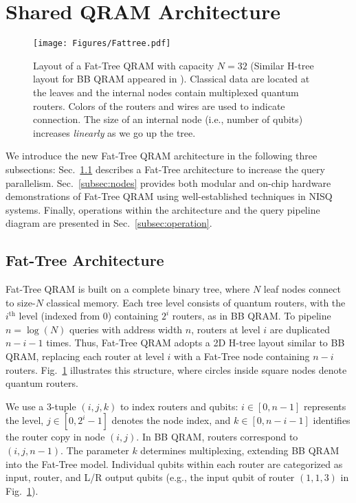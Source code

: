 \section{Shared QRAM Architecture}
\label{sec:arch}

\begin{figure}[t]
         \centering
         \texttt{[image: Figures/Fattree.pdf]}
         \caption{Layout of a Fat-Tree QRAM with capacity $N=32$ (Similar H-tree layout for BB QRAM appeared in \cite{xu2023systems}). Classical data are located at the leaves and the internal nodes contain multiplexed quantum routers. Colors of the routers and wires are used to indicate connection. The size of an internal node (i.e., number of qubits) increases \emph{linearly} as we go up the tree. 
         }
         \label{fig:fat}
\end{figure}

We introduce the new Fat-Tree QRAM architecture in the following three subsections: Sec.~\ref{subsec:fattree} describes a Fat-Tree architecture to increase the query parallelism. Sec.~\ref{subsec:nodes} provides both modular and on-chip hardware demonstrations of Fat-Tree QRAM using well-established techniques in NISQ systems. Finally, operations within the architecture and the query pipeline diagram are presented in Sec.~\ref{subsec:operation}.

\subsection{Fat-Tree Architecture}
\label{subsec:fattree}

Fat-Tree QRAM is built on a complete binary tree, where $N$ leaf nodes connect to size-$N$ classical memory. Each tree level consists of quantum routers, with the $i^{\text{th}}$ level (indexed from 0) containing $2^i$ routers, as in BB QRAM. To pipeline $n=\log(N)$ queries with address width $n$, routers at level $i$ are duplicated $n-i-1$ times. Thus, Fat-Tree QRAM adopts a 2D H-tree layout similar to BB QRAM, replacing each router at level $i$ with a Fat-Tree node containing $n-i$ routers. Fig.~\ref{fig:fat} illustrates this structure, where circles inside square nodes denote quantum routers. 

We use a 3-tuple $(i,j,k)$ to index routers and qubits: $i\in [0, n-1]$ represents the level, $j\in [0, 2^i-1]$ denotes the node index, and $k\in [0, n-i-1]$ identifies the router copy in node $(i,j)$. In BB QRAM, routers correspond to $(i,j,n-1)$. The parameter $k$ determines multiplexing, extending BB QRAM into the Fat-Tree model. Individual qubits within each router are categorized as input, router, and L/R output qubits (e.g., the input qubit of router $(1,1,3)$ in Fig.~\ref{fig:fat}).

